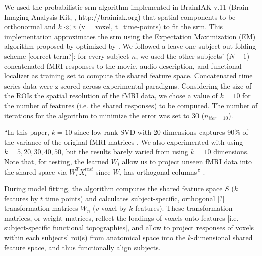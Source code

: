 We used the probabilistic \ac{srm} algorithm implemented in BrainIAK v.11 (Brain
Imaging Analysis Kit, \citet{kumar2020brainiak, kumar2020brainiaktutorial},
http://brainiak.org) that spatial components to be orthonormal and $k\ll v$ (v
= voxel, t=time-points) to fit the \ac{srm}.
%
This implementation approximates the \ac{srm} using the Expectation Maximization
(EM) algorithm proposed by \citep{chen2015reduced} optimized by
\citet{anderson2016enabling}.
%
We followed a leave-one-subject-out folding scheme [correct term?]:
%
for every subject $n$, we used the other subjects' ($N-1$) concatenated fMRI
responses to the movie, audio-description, and functional localizer as training
set to compute the shared feature space.
%
Concatenated time series data were z-scored across experimental
paradigms.
Considering the size of the ROIs the spatial resolution of the fMRI data, we
chose a value of $k=10$ for the number of features (i.e. the shared responses)
to be computed.
The number of iterations for the algorithm to minimize the error was set to 30
($n_{iter=10}$).


``In this paper, $k=10$ since low-rank SVD with 20 dimensions captures 90\% of
the variance of the original fMRI matrices \citep{chen2015reduced}. We also
experimented with using $k=5,20,30,40,50$, but the results barely varied from
using $k=10$ dimensions.  Note that, for testing, the learned $W_{i}$ allow us
to project unseen fMRI data into the shared space via $W_{i}^{T}X_{i}^{test}$
since $W_{i}$ has orthogonal columns'' \citep{vodrahalli2018mapping}.

%
During model fitting, the algorithm computes the shared feature space $S$ ($k$
features by $t$ time points) and calculates subject-specific, orthogonal [?]
transformation matrices $W_{n}$ ($v$ voxel by $k$ features).
%
These transformation matrices, or weight matrices, reflect the loadings of
voxels onto features [i.e. subject-specific functional topographies], and allow
to project responses of voxels within each subjects' \ac{roi}(s) from anatomical
space into the $k$-dimensional shared feature space, and thus functionally align
subjects.


